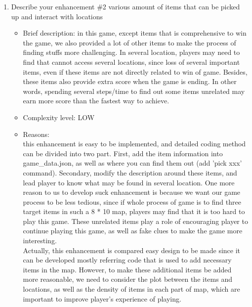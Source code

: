 \documentclass[11pt]{article}
\begin{document}
\begin{enumerate}
    \item Describe your enhancement \#2 various amount of items that can be picked up and interact with locations
    \begin{itemize}
        \item Brief description: in this game, except items that is comprehensive to win the game, we also provided a lot of other items to make the process of finding stuffs more challenging. In several location, players may need to find that cannot access several locations, since loss of several important items, even if these items are not directly related to win of game. Besides, these items also provide extra score when the game is ending. In other words, spending several steps/time to find out some items unrelated may earn more score than the fastest way to achieve.
        \item Complexity level: LOW
        \item Reasons: \\
        this enhancement is easy to be implemented, and detailed coding method can be divided into two part. First, add the item information into game\_data.json, as well as where you can find them out (add 'pick xxx' command). Secondary, modify the description around these items, and lead player to know what may be found in several location. One more reason to us to develop suck enhancement is because we want our game process to be less tedious, since if whole process of game is to find three target items in such a 8 * 10 map, players may find that it is too hard to play this game. These unrelated items play a role of encouraging player to continue playing this game, as well as fake clues to make the game more interesting.\\
        Actually, this enhancement is compared easy design to be made since it can be developed mostly referring code that is used to add necessary items in the map. However, to make these additional items be added more reasonable, we need to  consider the plot between the items and locations, as well as the density of items in each part of map, which are important to improve player's experience of playing.
    \end{itemize}


\end{enumerate}
\end{document}
